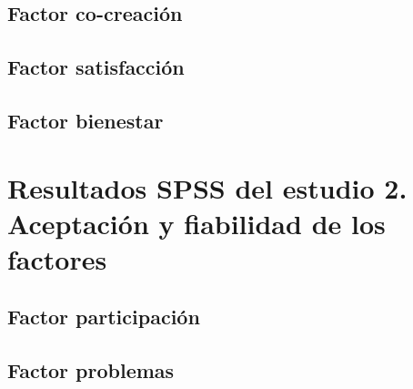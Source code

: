 \section{Factor co-creación}









\section{Factor satisfacción}





\newpage





\newpage

\section{Factor bienestar}










\chapter{Resultados SPSS del estudio 2. Aceptación y fiabilidad de los factores}
\label{anexo:10}
\section{Factor participación}



\section{Factor problemas}


